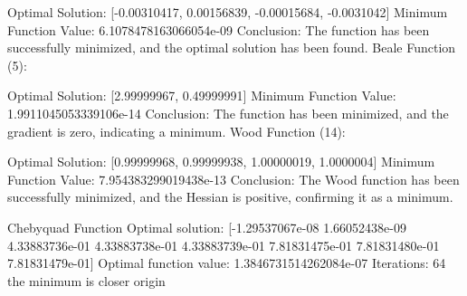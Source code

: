 \documentclass{article}
\begin{document}
Optimal Solution: [-0.00310417, 0.00156839, -0.00015684, -0.0031042]
Minimum Function Value: 6.1078478163066054e-09
Conclusion: The function has been successfully minimized, and the optimal solution has been found.
Beale Function (5):

Optimal Solution: [2.99999967, 0.49999991]
Minimum Function Value: 1.9911045053339106e-14
Conclusion: The function has been minimized, and the gradient is zero, indicating a minimum.
Wood Function (14):

Optimal Solution: [0.99999968, 0.99999938, 1.00000019, 1.0000004]
Minimum Function Value: 7.954383299019438e-13
Conclusion: The Wood function has been successfully minimized, and the Hessian is positive, confirming it as a minimum.


Chebyquad Function
Optimal solution: [-1.29537067e-08  1.66052438e-09  4.33883736e-01  4.33883738e-01
  4.33883739e-01  7.81831475e-01  7.81831480e-01  7.81831479e-01]
Optimal function value: 1.3846731514262084e-07
Iterations: 64
the minimum is closer origin
\end{document}
